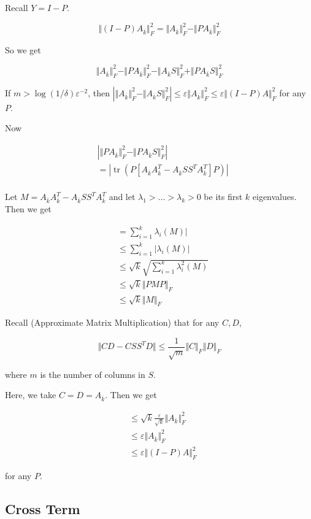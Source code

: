 \documentclass[11pt]{article}
\newcommand{\eps}{\varepsilon}
\newcommand{\Ab}{A_{\overline{k}}}
\DeclareMathOperator{\tr}{tr}
\begin{document}
Recall $Y = I - P$.

\[
\Vert (I - P) \Ab \Vert_F^2 = \Vert \Ab \Vert_F^2 - \Vert P \Ab \Vert_F^2
\]

So we get

\[
\Vert \Ab \Vert_F^2 - \Vert P \Ab \Vert_F^2 - \Vert \Ab S \Vert_F^2 + \Vert P \Ab S \Vert_F^2
\]

If $m > \log (1/\delta) \eps^{-2}$, then $| \Vert \Ab \Vert_F^2 - \Vert \Ab S \Vert_F^2 | \leq \eps \Vert \Ab \Vert_F^2 \leq \eps \Vert (I - P) A \Vert_F^2$ for any $P$.

Now

\begin{align*}
&| \Vert P \Ab \Vert_F^2 - \Vert P \Ab S \Vert_F^2 | \\
&= | \tr(P[\Ab \Ab^T - \Ab SS^T \Ab^T]P)| \\
\end{align*}

Let $M = \Ab \Ab^T - \Ab SS^T \Ab^T$ and let $\lambda_1 > ... > \lambda_k > 0$ be its first $k$ eigenvalues. Then we get

\begin{align*}
&= \sum\limits_{i=1}^k \lambda_i (M) | \\
&\leq \sum\limits_{i=1}^k | \lambda_i(M) | \\
&\leq \sqrt{k} \sqrt{\sum\limits_{i=1}^k \lambda_i^2(M)} \\
&\leq \sqrt{k} \Vert PMP \Vert_F \\
&\leq \sqrt{k} \Vert M \Vert_F
\end{align*}

Recall (Approximate Matrix Multiplication) that for any $C,D$,

\[
\Vert CD - CSS^T D \Vert \leq \frac{1}{\sqrt{m}} \Vert C \Vert_F \Vert D \Vert_F
\]

where $m$ is the number of columns in $S$.

Here, we take $C = D = \Ab$. Then we get

\begin{align*}
&\leq \sqrt{k} \frac{\eps}{\sqrt{k}} \Vert \Ab \Vert_F^2 \\
&\leq \eps \Vert \Ab \Vert_F^2 \\
&\leq \eps \Vert (I - P) A \Vert_F^2
\end{align*}

for any $P$.

\subsection{Cross Term}
\end{document}
